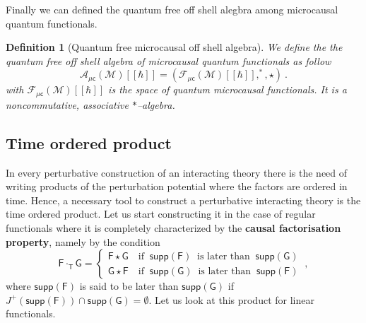 \documentclass[11pt]{book}
\newcommand{\supp}{\mathsf{supp}}
\newcommand{\muc}{\mu\csf}
\newcommand{\Acal}{\mathcal{A}}
\newcommand{\Fcal}{\mathcal{F}}
\newcommand{\Mcal}{\mathcal{M}}
\newcommand{\Fsf}{\mathsf{F}}
\newcommand{\Gsf}{\mathsf{G}}
\newcommand{\Tsf}{\mathsf{T}}
\newcommand{\csf}{\mathsf{c}}
\theoremstyle{break}
\newtheorem{definition}{Definition}[chapter]
\begin{document}
\bigskip


Finally we can defined the quantum free off shell alegbra among microcausal quantum functionals.


\begin{definition}[Quantum free microcausal off shell algebra]
We define the the quantum free off shell algebra of microcausal quantum functionals as follow
%
\begin{equation*}
\Acal_{\muc}(\Mcal)[[\hbar]] = \left(\Fcal_{\muc}(\Mcal)[[\hbar]] , ^\ast , \star \right) \ . 
\end{equation*}
%
with $\Fcal_{\muc}(\Mcal)[[\hbar]]$ is the space of quantum microcausal functionals. It is a noncommutative, associative $\ast$--algebra.
\end{definition}



\subsection{Time ordered product}
\label{p:PROD_TIME}


In every perturbative construction of an interacting theory there is the need of writing products of the perturbation potential where the factors are ordered in time. Hence, a necessary tool to construct a perturbative interacting theory is the time ordered product. Let us start constructing it in the case of regular functionals where it is completely characterized by the \textbf{causal factorisation property}, namely by the condition
%
\begin{equation}
\Fsf \cdot_\Tsf \Gsf = 
\left\{
\begin{array}{ll}
\Fsf \star \Gsf \quad \mbox{if } \ \supp(\Fsf) \ \mbox{ is later than  } \ \supp(\Gsf)  \\
\Gsf \star \Fsf \quad \mbox{if } \ \supp(\Gsf) \ \mbox{ is later than  } \ \supp(\Fsf) 
\end{array}
\right. \ ,
\label{eq:causal_factorization}
\end{equation}
%
where $\supp(\Fsf)$ is said to be  later than   $\supp(\Gsf)$ if $J^+(\supp(\Fsf)) \cap \supp(\Gsf)=\emptyset$. Let us look at this product for linear functionals.
\end{document}
